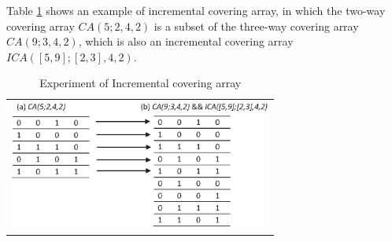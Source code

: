 \documentclass[conference]{IEEEtran}
\theoremstyle{definition}
\begin{document}
Table \ref{ica_example} shows an example of incremental covering array, in which the two-way covering array $CA(5;2,4,2)$ is a subset of the three-way covering array $CA(9;3,4,2)$, which is also an incremental covering array $ICA([5,9];[2,3],4,2)$.

\begin{table}[htbp]
  \small
  \centering
  \caption{Experiment of Incremental covering array}
  \label{ica_example}

    \begin{tabular}{c}
 \includegraphics[width=3.4in]{incremental_covering_ex.eps}
    \end{tabular}%

\end{table}

%
%
%
%
\end{document}
